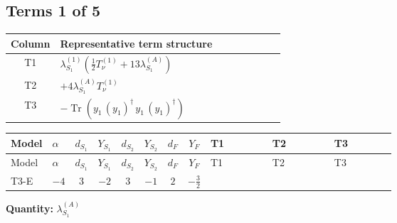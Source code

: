 \documentclass[8pt]{article}
\begin{document}
\begin{landscape}
\subsection*{Terms 1 of 5}
\begin{center}
\begin{tabular}{@{}c >{\raggedright\arraybackslash}p{0.82\linewidth}@{}}
\toprule
Column & Representative term structure \\
\midrule
T1 & \(\displaystyle {\lambda_{S_1}^{(1)}} \left(\frac{1}{2} T_{\nu}^{(1)}+13 {\lambda_{S_1}^{(A)}}\right)\) \\
\midrule
T2 & \(\displaystyle +4 {\lambda_{S_1}^{(A)}} T_{\nu}^{(1)}\) \\
\midrule
T3 & \(\displaystyle -\operatorname{Tr}\!\left({y_1}\,\left({y_1}\right)^{\dagger}\,{y_1}\,\left({y_1}\right)^{\dagger}\right)\) \\
\midrule
\bottomrule
\end{tabular}
\end{center}
\smallskip
\tiny
\begin{longtable}{@{}llcccccc >{\raggedright\arraybackslash}p{0.21\linewidth} >{\raggedright\arraybackslash}p{0.21\linewidth} >{\raggedright\arraybackslash}p{0.21\linewidth}@{}}
\toprule
Model & $\alpha$ & $d_{S_1}$ & $Y_{S_1}$ & $d_{S_2}$ & $Y_{S_2}$ & $d_F$ & $Y_F$ & T1 & T2 & T3 \\
\midrule
\endfirsthead
\toprule
Model & $\alpha$ & $d_{S_1}$ & $Y_{S_1}$ & $d_{S_2}$ & $Y_{S_2}$ & $d_F$ & $Y_F$ & T1 & T2 & T3 \\
\midrule
\endhead
T3-E & $-4$ & $3$ & $-2$ & $3$ & $-1$ & $2$ & $-\frac{3}{2}$ & \scriptsize\adjustbox{max width=\linewidth}{$\begin{gathered} {\lambda_{S_1}^{(1)}} \left(\frac{1}{2} T_{\nu}^{(1)}+13 {\lambda_{S_1}^{(A)}}\right)\end{gathered}$} & \scriptsize\adjustbox{max width=\linewidth}{$\begin{gathered} +4 {\lambda_{S_1}^{(A)}} T_{\nu}^{(1)}\end{gathered}$} & \scriptsize\adjustbox{max width=\linewidth}{$\begin{gathered} -\operatorname{Tr}\!\left({y_1}\,\left({y_1}\right)^{\dagger}\,{y_1}\,\left({y_1}\right)^{\dagger}\right)\end{gathered}$} \\
\midrule
\bottomrule
\end{longtable}
\clearpage
\noindent\textbf{Quantity: }$\lambda_{S_1}^{(A)}$\par\smallskip

\end{landscape}
\end{document}
